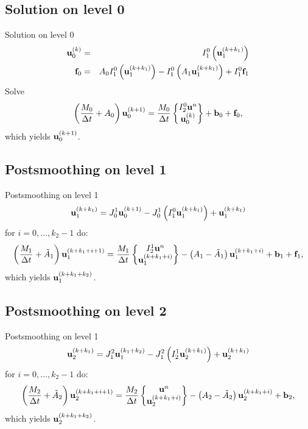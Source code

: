 \documentclass[mathserif]{beamer}
\begin{document}
\subsection{Solution on level 0}
\begin{frame}
{\Large Solution on level 0}
\begin{eqnarray*}
\mathbf{u}_0^{(k)} & = & I_1^0\left(\mathbf{u}_1^{(k+k_1)}\right)\\
\mathbf{f}_0 & = & A_0 I_1^0\left(\mathbf{u}_1^{(k+k_1)}\right) - I_1^0\left(A_1 \mathbf{u}_1^{(k+k_1)}\right) + I_1^0 \mathbf{f}_1
\end{eqnarray*}
Solve 
\[
\left(\frac{M_0}{\Delta t} + A_0\right) \mathbf{u}_0^{(k+1)}
=  \frac{M_0}{\Delta t} \begin{Bmatrix} I_2^0 \mathbf{u}^n\\\mathbf{u}_0^{(k)} \end{Bmatrix} + \mathbf{b}_0 + \mathbf{f}_0,
\]
which yields $\mathbf{u}_0^{(k+1)}$.
\end{frame}


\subsection{Postsmoothing on level 1}
\begin{frame}
{\Large Postsmoothing on level 1}
\[
\mathbf{u}_1^{(k+k_1)} = J_0^1 \mathbf{u}_0^{(k+1)} - J_0^1\left(I_1^0 \mathbf{u}_1^{(k+k_1)}\right) + \mathbf{u}_1^{(k+k_1)}
\]
for $i = 0, \dots, k_2-1$ do:
\[
\left(\frac{M_1}{\Delta t} + \tilde{A}_1\right) \mathbf{u}_1^{(k+k_1+i+1)} 
= \frac{M_1}{\Delta t} \begin{Bmatrix} I_2^1 \mathbf{u}^n\\ \mathbf{u}_1^{(k+k_1+i)} \end{Bmatrix}
- \left(A_1-\tilde{A}_1\right) \mathbf{u}_1^{(k+k_1+i)} + \mathbf{b}_1 + \mathbf{f}_1,
\]
which yields $\mathbf{u}_1^{(k+k_1+k_2)}$.

\end{frame}
\subsection{Postsmoothing on level 2}
\begin{frame}
{\Large Postsmoothing on level 1}
\[
\mathbf{u}_2^{(k+k_1)} = J_1^2 \mathbf{u}_1^{(k_1+k_2)} - J_1^2\left(I_2^1 \mathbf{u}_2^{(k+k_1)}\right) + \mathbf{u}_2^{(k+k_1)}
\]
for $i = 0, \dots, k_2-1$ do:
\[
\left(\frac{M_2}{\Delta t} + \tilde{A}_2\right) \mathbf{u}_2^{(k+k_1+i+1)} 
= \frac{M_2}{\Delta t} \begin{Bmatrix} \mathbf{u}^n\\ \mathbf{u}_2^{(k+k_1+i)} \end{Bmatrix}
- \left(A_2-\tilde{A}_2\right) \mathbf{u}_2^{(k+k_1+i)} + \mathbf{b}_2,
\]
which yields $\mathbf{u}_2^{(k+k_1+k_2)}$.
\end{frame}
\end{document}
